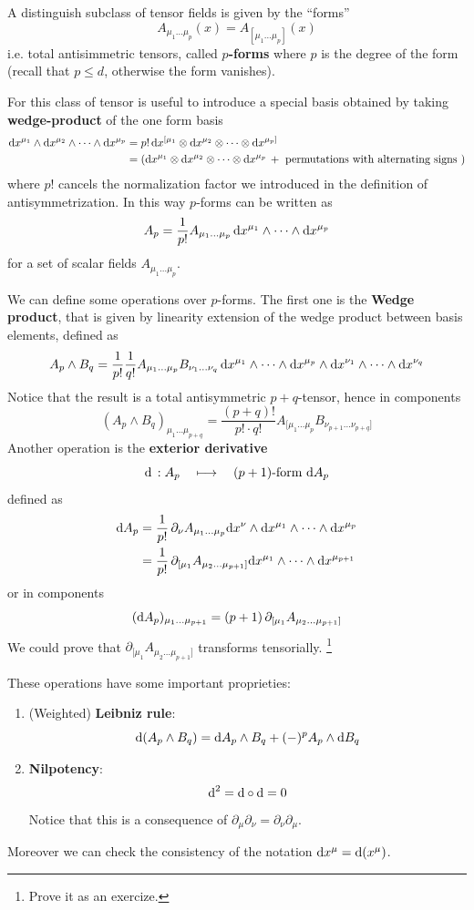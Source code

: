 \documentclass[../main/main.tex]{subfiles}
\begin{document}
\begin{definition}{}

A distinguish subclass of tensor fields is given by the ``{forms}''
\[A_{\mu_1\dots\mu_p}(x)=A_{[\mu_1\dots\mu_p]}(x)\]
i.e. total antisimmetric tensors, called \textbf{$p$-forms} where $p$ is the degree of the form (recall that $p\leq d$, otherwise the form vanishes).

For this class of tensor is useful to introduce a special basis obtained by taking \textbf{wedge-product} of the one form basis
\begin{align*}
\textup{d} x^{\mu_1}\wedge\textup{d} x^{\mu_2}\wedge\dots\wedge\textup{d} x^{\mu_p}
&=p!\,\textup{d} x^{[\mu_1}\otimes\textup{d} x^{\mu_2}\otimes\dots\otimes\textup{d} x^{\mu_p]}\\
&=(\textup{d} x^{\mu_1}\otimes\textup{d} x^{\mu_2}\otimes\dots\otimes\textup{d} x^{\mu_p}\,+\text{ permutations with alternating signs })
\end{align*}
where $p!$ cancels the normalization factor we introduced in the definition of antisymmetrization. In this way $p$-forms can be written as 
\[A_p=\frac1{p!}A_{\mu_1\dots\mu_p}\,\textup{d} x^{\mu_1}\wedge\dots\wedge\textup{d} x^{\mu_p}\]
for a set of scalar fields $A_{\mu_1\dots\mu_p}$.

We can define some operations over $p$-forms. The first one is the \textbf{Wedge product}, that is given by linearity extension of the wedge product between basis elements, defined as
\[A_p\wedge B_q=\frac1{p!}\frac1{q!}A_{\mu_1\dots\mu_p}B_{\nu_1\dots\nu_q}\,\textup{d} x^{\mu_1}\wedge\dots\wedge\textup{d} x^{\mu_p}\wedge\textup{d} x^{\nu_1}\wedge\dots\wedge\textup{d} x^{\nu_q}\]
Notice that the result is a total antisymmetric $p+q$-tensor, hence  in components
\[(A_p\wedge B_q)_{\mu_1\dots\mu_{p+q}}=\frac{(p+q)!}{p!\cdot q!}A_{[\mu_1\dots\mu_p}B_{\nu_{p+1}\dots\nu_{p+q}]}\]
Another operation is the \textbf{exterior derivative}
\[\textup{d}\,:A_p\quad\longmapsto\quad(p+1)\text{-form }\textup{d} A_p\]
defined as
\begin{align*}
\textup{d} A_p&=\frac1{p!}\,\partial_\nu A_{\mu_1\dots\mu_p}\textup{d} x^\nu\wedge\textup{d} x^{\mu_1}\wedge\dots\wedge\textup{d} x^{\mu_p}\\
&=\frac1{p!}\,\partial_{[\mu_1} A_{\mu_2\dots\mu_{p+1}]}\textup{d} x^{\mu_1}\wedge\dots\wedge\textup{d} x^{\mu_{p+1}}
\end{align*}
or in components
\[(\textup{d} A_p)_{\mu_1\dots\mu_{p+1}}=(p+1)\,\partial_{[\mu_1} A_{\mu_2\dots\mu_{p+1}]}\]
We could prove that $\partial_{[\mu_1} A_{\mu_2\dots\mu_{p+1}]}$ transforms tensorially. \footnote{Prove it as an exercize.}

These operations have some important proprieties:
\begin{enumerate}
\item (Weighted) \textbf{Leibniz rule}: \[\textup{d}(A_p\wedge B_q)=\textup{d} A_p\wedge B_q+(-)^pA_p\wedge \textup{d} B_q\]
\item \textbf{Nilpotency}:
\[\textup{d}^2=\textup{d}\circ\textup{d}=0\]
Notice that this is a consequence of $\partial_\mu\partial_\nu=\partial_\nu\partial_\mu$.
\end{enumerate}
Moreover we can check the consistency of the notation
$\textup{d} x^\mu=\textup{d}(x^\mu)$.


\end{definition}
\end{document}
